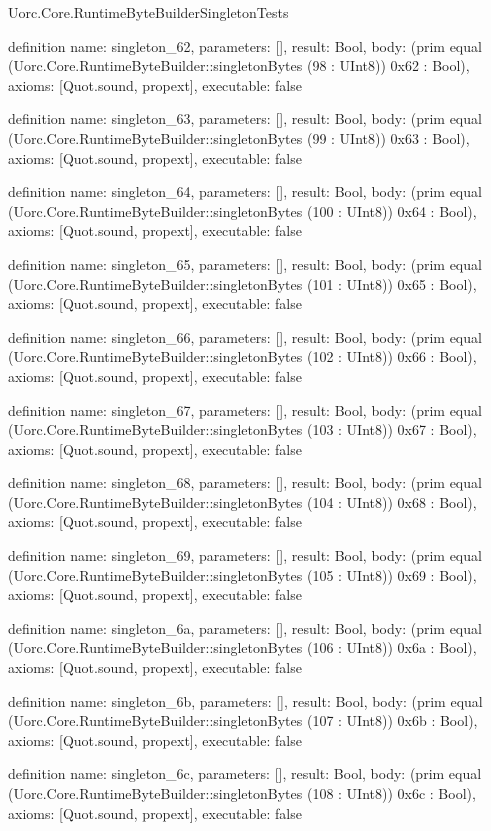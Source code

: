 \begin{lexlean}{Uorc.Core.RuntimeByteBuilderSingletonTests}
\begin{semanticmodule}
definition{
  name: singleton_62,
  parameters: [],
  result: Bool,
  body: (prim equal (Uorc.Core.RuntimeByteBuilder::singletonBytes (98 : UInt8)) 0x62 : Bool),
  axioms: [Quot.sound, propext],
  executable: false
}

definition{
  name: singleton_63,
  parameters: [],
  result: Bool,
  body: (prim equal (Uorc.Core.RuntimeByteBuilder::singletonBytes (99 : UInt8)) 0x63 : Bool),
  axioms: [Quot.sound, propext],
  executable: false
}

definition{
  name: singleton_64,
  parameters: [],
  result: Bool,
  body: (prim equal (Uorc.Core.RuntimeByteBuilder::singletonBytes (100 : UInt8)) 0x64 : Bool),
  axioms: [Quot.sound, propext],
  executable: false
}

definition{
  name: singleton_65,
  parameters: [],
  result: Bool,
  body: (prim equal (Uorc.Core.RuntimeByteBuilder::singletonBytes (101 : UInt8)) 0x65 : Bool),
  axioms: [Quot.sound, propext],
  executable: false
}

definition{
  name: singleton_66,
  parameters: [],
  result: Bool,
  body: (prim equal (Uorc.Core.RuntimeByteBuilder::singletonBytes (102 : UInt8)) 0x66 : Bool),
  axioms: [Quot.sound, propext],
  executable: false
}

definition{
  name: singleton_67,
  parameters: [],
  result: Bool,
  body: (prim equal (Uorc.Core.RuntimeByteBuilder::singletonBytes (103 : UInt8)) 0x67 : Bool),
  axioms: [Quot.sound, propext],
  executable: false
}

definition{
  name: singleton_68,
  parameters: [],
  result: Bool,
  body: (prim equal (Uorc.Core.RuntimeByteBuilder::singletonBytes (104 : UInt8)) 0x68 : Bool),
  axioms: [Quot.sound, propext],
  executable: false
}

definition{
  name: singleton_69,
  parameters: [],
  result: Bool,
  body: (prim equal (Uorc.Core.RuntimeByteBuilder::singletonBytes (105 : UInt8)) 0x69 : Bool),
  axioms: [Quot.sound, propext],
  executable: false
}

definition{
  name: singleton_6a,
  parameters: [],
  result: Bool,
  body: (prim equal (Uorc.Core.RuntimeByteBuilder::singletonBytes (106 : UInt8)) 0x6a : Bool),
  axioms: [Quot.sound, propext],
  executable: false
}

definition{
  name: singleton_6b,
  parameters: [],
  result: Bool,
  body: (prim equal (Uorc.Core.RuntimeByteBuilder::singletonBytes (107 : UInt8)) 0x6b : Bool),
  axioms: [Quot.sound, propext],
  executable: false
}

definition{
  name: singleton_6c,
  parameters: [],
  result: Bool,
  body: (prim equal (Uorc.Core.RuntimeByteBuilder::singletonBytes (108 : UInt8)) 0x6c : Bool),
  axioms: [Quot.sound, propext],
  executable: false
}


\end{semanticmodule}
\end{lexlean}

